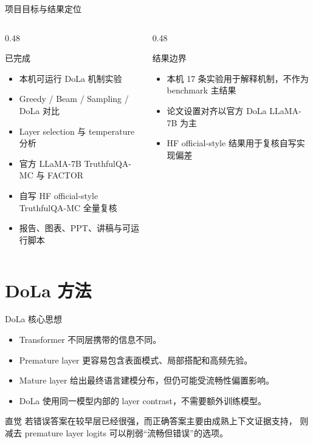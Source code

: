 \documentclass[aspectratio=169,11pt]{ctexbeamer}
\begin{document}
\begin{frame}{项目目标与结果定位}
  \begin{columns}[T,onlytextwidth]
    \begin{column}{0.48\textwidth}
      \begin{block}{已完成}
        \begin{itemize}
          \item 本机可运行 DoLa 机制实验
          \item Greedy / Beam / Sampling / DoLa 对比
          \item Layer selection 与 temperature 分析
          \item 官方 LLaMA-7B TruthfulQA-MC 与 FACTOR
          \item 自写 HF official-style TruthfulQA-MC 全量复核
          \item 报告、图表、PPT、讲稿与可运行脚本
        \end{itemize}
      \end{block}
    \end{column}
    \begin{column}{0.48\textwidth}
      \begin{alertblock}{结果边界}
        \begin{itemize}
          \item 本机 17 条实验用于解释机制，不作为 benchmark 主结果
          \item 论文设置对齐以官方 DoLa LLaMA-7B 为主
          \item HF official-style 结果用于复核自写实现偏差
        \end{itemize}
      \end{alertblock}
    \end{column}
  \end{columns}
\end{frame}

\section{DoLa 方法}

\begin{frame}{DoLa 核心思想}
  \begin{itemize}
    \item Transformer 不同层携带的信息不同。
    \item Premature layer 更容易包含表面模式、局部搭配和高频先验。
    \item Mature layer 给出最终语言建模分布，但仍可能受流畅性偏置影响。
    \item DoLa 使用同一模型内部的 layer contrast，不需要额外训练模型。
  \end{itemize}

  \vspace{0.5em}
  \begin{block}{直觉}
    若错误答案在较早层已经很强，而正确答案主要由成熟上下文证据支持，
    则减去 premature layer logits 可以削弱“流畅但错误”的选项。
  \end{block}
\end{frame}
\end{document}
